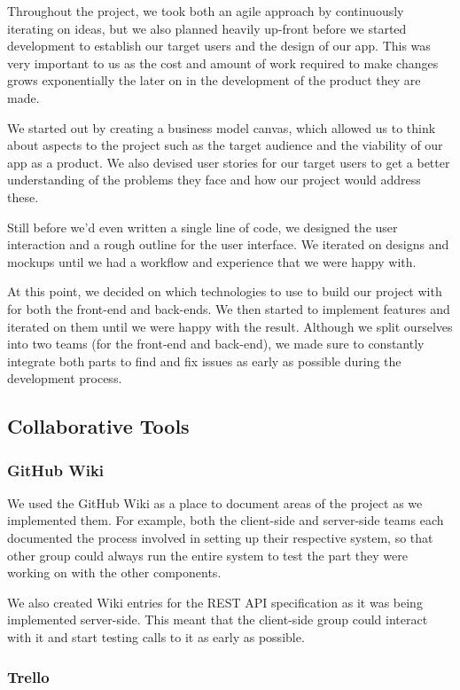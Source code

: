 \documentclass[11pt]{article}
\begin{document}
Throughout the project, we took both an agile approach by continuously iterating on ideas, but we also planned heavily up-front before we started development to establish our target users and the design of our app. This was very important to us as the cost and amount of work required to make changes grows exponentially the later on in the development of the product they are made.

We started out by creating a business model canvas, which allowed us to think about aspects to the project such as the target audience and the viability of our app as a product. We also devised user stories for our target users to get a better understanding of the problems they face and how our project would address these.

Still before we'd even written a single line of code, we designed the user interaction and a rough outline for the user interface. We iterated on designs and mockups until we had a workflow and experience that we were happy with.

At this point, we decided on which technologies to use to build our project with for both the front-end and back-ends. We then started to implement features and iterated on them until we were happy with the result. Although we split ourselves into two teams (for the front-end and back-end), we made sure to constantly integrate both parts to find and fix issues as early as possible during the development process.

\subsection {Collaborative Tools}
\subsubsection {GitHub Wiki}
We used the GitHub Wiki as a place to document areas of the project as we implemented them. For example, both the client-side and server-side teams each documented the process involved in setting up their respective system, so that other group could always run the entire system to test the part they were working on with the other components.

We also created Wiki entries for the REST API specification as it was being implemented server-side. This meant that the client-side group could interact with it and start testing calls to it as early as possible.
\subsubsection {Trello}
\end{document}
